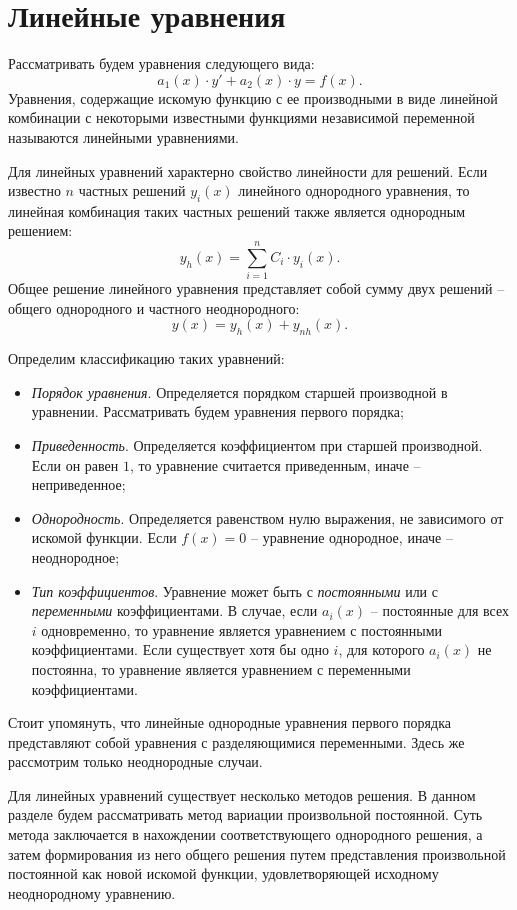 \section{Линейные уравнения}

	Рассматривать будем уравнения следующего вида:
	\[ a_1(x) \cdot y' + a_2(x) \cdot y = f(x). \]
	Уравнения, содержащие искомую функцию с ее производными в виде линейной комбинации с некоторыми известными функциями независимой переменной называются линейными уравнениями.

	Для линейных уравнений характерно свойство линейности для решений. Если известно $n$ частных решений $y_i(x)$ линейного однородного уравнения, то линейная комбинация таких частных решений также является однородным решением:
	\[ y_h(x) = \sum_{i = 1}^n C_i \cdot y_i(x). \]
	Общее решение линейного уравнения представляет собой сумму двух решений -- общего однородного и частного неоднородного:
	\[ y(x) = y_h(x) + y_{nh}(x). \]

	Определим классификацию таких уравнений:
	\begin{itemize}
		\item \textit{Порядок уравнения}. Определяется порядком старшей производной в уравнении. Рассматривать будем уравнения первого порядка;
		\item \textit{Приведенность}. Определяется коэффициентом при старшей производной. Если он равен $1$, то уравнение считается приведенным, иначе -- неприведенное;
		\item \textit{Однородность}. Определяется равенством нулю выражения, не зависимого от искомой функции. Если $f(x) = 0$ -- уравнение однородное, иначе -- неоднородное;
		\item \textit{Тип коэффициентов}. Уравнение может быть с \textit{постоянными} или с \textit{переменными} коэффициентами. В случае, если $a_i(x)$ -- постоянные для всех $i$ одновременно, то уравнение является уравнением с постоянными коэффициентами. Если существует хотя бы одно $i$, для которого $a_i(x)$ не постоянна, то уравнение является уравнением с переменными коэффициентами.
	\end{itemize}

	Стоит упомянуть, что линейные однородные уравнения первого порядка представляют собой уравнения с разделяющимися переменными. Здесь же рассмотрим только неоднородные случаи.

	Для линейных уравнений существует несколько методов решения. В данном разделе будем рассматривать метод вариации произвольной постоянной. Суть метода заключается в нахождении соответствующего однородного решения, а затем формирования из него общего решения путем представления произвольной постоянной как новой искомой функции, удовлетворяющей исходному неоднородному уравнению.

